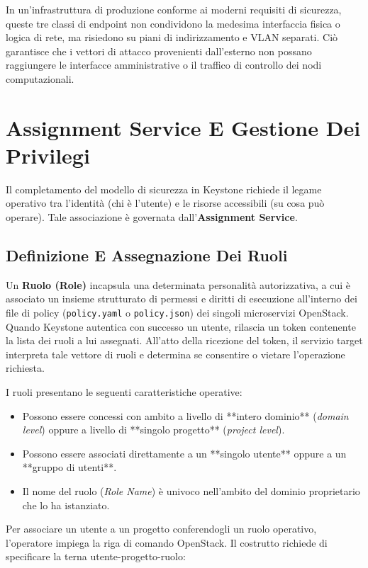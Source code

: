 \documentclass[11pt, a4paper]{article}
\begin{document}
In un'infrastruttura di produzione conforme ai moderni requisiti di sicurezza, queste tre classi di endpoint non condividono la medesima interfaccia fisica o logica di rete, ma risiedono su piani di indirizzamento e VLAN separati. Ciò garantisce che i vettori di attacco provenienti dall'esterno non possano raggiungere le interfacce amministrative o il traffico di controllo dei nodi computazionali.

\newpage

\section{Assignment Service E Gestione Dei Privilegi}

Il completamento del modello di sicurezza in Keystone richiede il legame operativo tra l'identità (chi è l'utente) e le risorse accessibili (su cosa può operare). Tale associazione è governata dall'\textbf{Assignment Service}.

\subsection{Definizione E Assegnazione Dei Ruoli}

Un \textbf{Ruolo (Role)} incapsula una determinata personalità autorizzativa, a cui è associato un insieme strutturato di permessi e diritti di esecuzione all'interno dei file di policy (\texttt{policy.yaml} o \texttt{policy.json}) dei singoli microservizi OpenStack. Quando Keystone autentica con successo un utente, rilascia un token contenente la lista dei ruoli a lui assegnati. All'atto della ricezione del token, il servizio target interpreta tale vettore di ruoli e determina se consentire o vietare l'operazione richiesta.

I ruoli presentano le seguenti caratteristiche operative:
\begin{itemize}[noitemsep]
    \item Possono essere concessi con ambito a livello di **intero dominio** (\emph{domain level}) oppure a livello di **singolo progetto** (\emph{project level}).
    \item Possono essere associati direttamente a un **singolo utente** oppure a un **gruppo di utenti**.
    \item Il nome del ruolo (\emph{Role Name}) è univoco nell'ambito del dominio proprietario che lo ha istanziato.
\end{itemize}

Per associare un utente a un progetto conferendogli un ruolo operativo, l'operatore impiega la riga di comando OpenStack. Il costrutto richiede di specificare la terna utente-progetto-ruolo:
\end{document}
